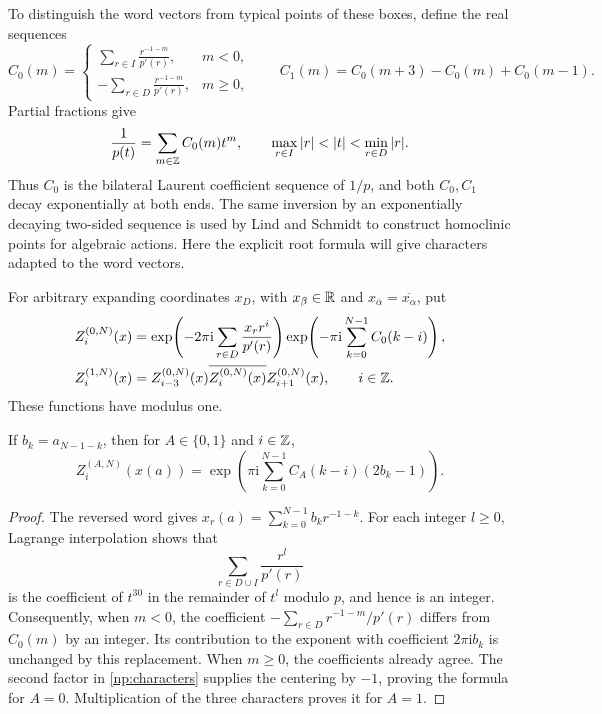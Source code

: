 To distinguish the word vectors from typical points of these boxes, define
the real sequences
\begin{equation}
 C_0(m)=
 \begin{cases}
  \displaystyle\sum_{r\in I}\frac{r^{-1-m}}{p'(r)},&m<0,\\[4pt]
  \displaystyle-\sum_{r\in D}\frac{r^{-1-m}}{p'(r)},&m\ge0,
 \end{cases}
 \qquad C_1(m)=C_0(m+3)-C_0(m)+C_0(m-1).
 \label{np:coefficients}
\end{equation}
Partial fractions give
\[
 \frac1{p(t)}=\sum_{m\in\Z}C_0(m)t^m,
 \qquad \max_{r\in I}|r|<|t|<\min_{r\in D}|r|.
\]
Thus \(C_0\) is the bilateral Laurent coefficient sequence of \(1/p\), and
both \(C_0,C_1\) decay exponentially at both ends. The same inversion by an
exponentially decaying two-sided sequence is used by Lind and Schmidt
\cite[Lemma~4.5 and Example~4.7]{LindSchmidt1999} to construct homoclinic points for algebraic
actions. Here the explicit root formula will give characters adapted to the
word vectors.

For arbitrary expanding
coordinates \(x_D\), with \(x_\beta\in\mathbb R\) and
\(x_{\overline\alpha}=\overline{x_\alpha}\), put
\begin{equation}
 \begin{split}
 Z_i^{(0,N)}(x)
 &=\exp\!\left(-2\pi\mathrm i\sum_{r\in D}
                   \frac{x_rr^i}{p'(r)}\right)
   \exp\!\left(-\pi\mathrm i\sum_{k=0}^{N-1}C_0(k-i)\right),\\
 Z_i^{(1,N)}(x)
 &=Z_{i-3}^{(0,N)}(x)\overline{Z_i^{(0,N)}(x)}Z_{i+1}^{(0,N)}(x),
 \qquad i\in\mathbb Z.
 \end{split}
 \label{np:characters}
\end{equation}
These functions have modulus one.

\begin{lemma}\label{np:word-character}
If \(b_k=a_{N-1-k}\), then for \(A\in\{0,1\}\) and \(i\in\mathbb Z\),
\begin{equation}
 Z_i^{(A,N)}(x(a))
 =\exp\!\left(\pi\mathrm i\sum_{k=0}^{N-1}
                     C_A(k-i)(2b_k-1)\right).
 \label{np:word-character-formula}
\end{equation}
\end{lemma}

\begin{proof}
The reversed word gives \(x_r(a)=\sum_{k=0}^{N-1}b_kr^{-1-k}\).
For each integer \(l\ge0\), Lagrange interpolation shows that
\[
 \sum_{r\in D\cup I}\frac{r^l}{p'(r)}
\]
is the coefficient of \(t^{30}\) in the remainder of \(t^l\) modulo \(p\),
and hence is an integer. Consequently, when \(m<0\), the coefficient
\(-\sum_{r\in D}r^{-1-m}/p'(r)\) differs from \(C_0(m)\) by an integer.
Its contribution to the exponent with coefficient \(2\pi\mathrm i b_k\)
is unchanged by this replacement. When \(m\ge0\), the coefficients
already agree. The second factor in \eqref{np:characters} supplies the
centering by \(-1\), proving the formula for \(A=0\). Multiplication of
the three characters proves it for \(A=1\).
\end{proof}


